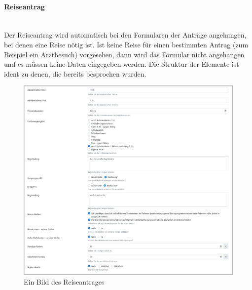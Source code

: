 \paragraph{Reiseantrag}
~\\
Der Reiseantrag wird automatisch bei den Formularen der Anträge angehangen, bei denen eine Reise nötig ist. Ist keine Reise für einen bestimmten Antrag (zum Beispiel ein Arztbesuch) vorgesehen, dann wird das Formular nicht angehangen und es müssen keine  Daten eingegeben werden. Die Struktur der Elemente ist ident zu denen, die bereits besprochen wurden.
\begin{figure}[H]
	\centering
	\includegraphics[width=1\linewidth]{images/ldehner_implementierung/zusatz_1}
	\caption[Reiseantrag]{Ein Bild des Reiseantrages}
	\label{fig:zusatz1}
\end{figure}

